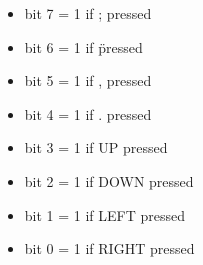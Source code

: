\begin{itemize}
\item bit 7 = 1 if ; pressed
\item bit 6 = 1 if \" pressed
\item bit 5 = 1 if , pressed
\item bit 4 = 1 if . pressed
\item bit 3 = 1 if UP pressed
\item bit 2 = 1 if DOWN pressed
\item bit 1 = 1 if LEFT pressed
\item bit 0 = 1 if RIGHT pressed
\end{itemize}
